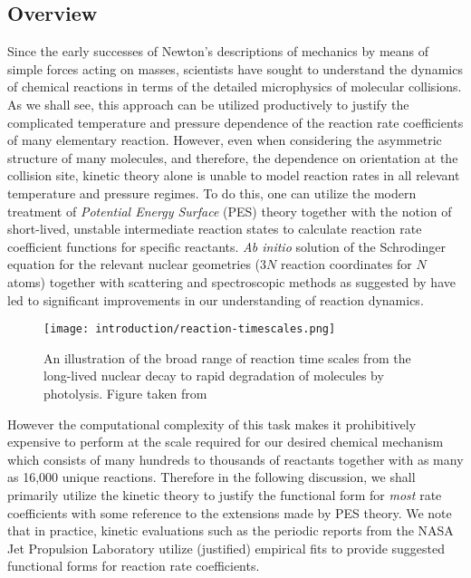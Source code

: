 \subsection{Overview}

Since the early successes of Newton's descriptions of mechanics by means of simple forces acting on masses, scientists have sought to understand the dynamics of chemical reactions in terms of the detailed microphysics of molecular collisions. As we shall see, this approach can be utilized productively to justify the complicated temperature and pressure dependence of the reaction rate coefficients of many elementary reaction. However, even when considering the asymmetric structure of many molecules, and therefore, the dependence on orientation at the collision site, kinetic theory alone is unable to model reaction rates in all relevant temperature and pressure regimes. To do this, one can utilize the modern treatment of \textit{Potential Energy Surface} (PES) theory together with the notion of short-lived, unstable intermediate reaction states to calculate reaction rate coefficient functions for specific reactants. \textit{Ab initio} solution of the Schrodinger equation for the relevant nuclear geometries ($3N$ reaction coordinates for $N$ atoms) together with scattering and spectroscopic methods as suggested by \cite{transition-state-spectroscopy-bimol} have led to significant improvements in our understanding of reaction dynamics.



\begin{figure}[h]
  \centering
  \texttt{[image: introduction/reaction-timescales.png]}
  \caption{An illustration of the broad range of reaction time scales from the long-lived nuclear decay to rapid degradation of molecules by photolysis. Figure taken from \cite{arnaut2006chemical}}
  \label{fig:reaction-timescales}
\end{figure}


However the computational complexity of this task makes it prohibitively expensive to perform at the scale required for our desired chemical mechanism which consists of many hundreds to thousands of reactants together with as many as 16,000 unique reactions. Therefore in the following discussion, we shall primarily utilize the kinetic theory to justify the functional form for \textit{most} rate coefficients with some reference to the extensions made by PES theory. We note that in practice, kinetic evaluations such as the periodic reports from the NASA Jet Propulsion Laboratory \cite{jpl-kinetic-evaluation-2020} utilize (justified) empirical fits to provide suggested functional forms for reaction rate coefficients.

